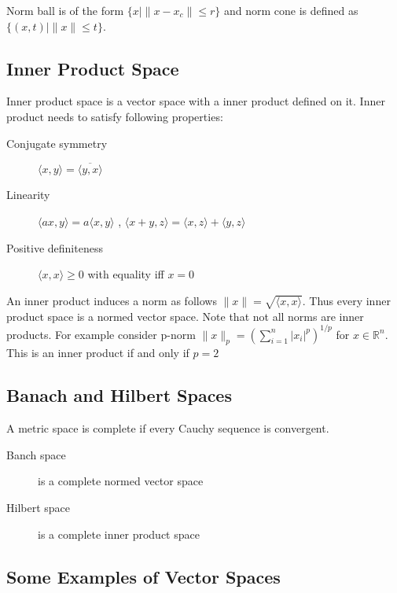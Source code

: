 \documentclass[a4paper,11pt]{article}
\newcommand{\Rn}{\mathbb{R}^n}
\newcommand{\norm}[1]{\|#1\|}
\newcommand*\conj[1]{\overline{#1}}
\newcommand\inrpd[2]{\langle #1, #2 \rangle}
\begin{document}
Norm ball is of the form $\{x \mid \norm{x-x_c} \leq r \}$ and norm cone is defined as $\{(x,t) \mid \norm{x} \leq t \}$.

\subsection{Inner Product Space}
Inner product space is a vector space with a inner product defined on it. Inner product needs to satisfy following properties:
\begin{description}
\item[Conjugate symmetry] $\inrpd{x}{y}= \conj{\inrpd{y}{x}}$
\item[Linearity] $\inrpd{ax}{y} = a  \inrpd{x}{y}$ , $\inrpd{x+y}{z} =  \inrpd{x}{z}+ \inrpd{y}{z}$
\item[Positive definiteness] $\inrpd{x}{x} \geq 0$ with equality iff $x = 0$
\end{description} 

An inner product induces a norm as follows $\|x\| = \sqrt{\inrpd{x}{x}}$. Thus every inner product space is a normed vector space.
Note that not all norms are inner products. For example consider p-norm $\|x\|_p = \left(\sum_{i = 1}^n |x_i|^p \right)^{1/p}$ for $x \in \Rn$. This is an inner product if and only if $p = 2$

\subsection{Banach and Hilbert Spaces}
A metric space is complete if every Cauchy sequence is convergent.
\begin{description}
\item[Banch space] is a complete normed vector space
\item[Hilbert space] is a complete inner product space
\end{description}

\subsection{Some Examples of Vector Spaces}
\end{document}
